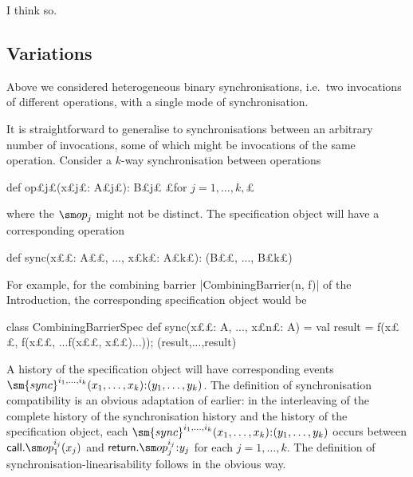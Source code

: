 
  I think so.


\subsection{Variations}
\label{ssec:spec-variations}

Above we considered heterogeneous binary synchronisations, i.e.~two
invocations of different operations, with a single mode of synchronisation.

It is straightforward to generalise to synchronisations between an arbitrary
number of invocations, some of which might be invocations of the same
operation.  Consider a $k$-way synchronisation between operations
\begin{scala}
  def op£\s j£(x£\s j£: A£\s j£): B£\s j£   £for $j = 1, \ldots, k,$£
\end{scala}
%
where the $\op_j$ might not be distinct.
The specification object will have a corresponding operation
%
\begin{scala} 
  def sync(x££: A££, ..., x£\s k£: A£\s k£): (B££, ..., B£\s k£)
\end{scala}
%
For example, for the combining barrier |CombiningBarrier(n, f)| of the
Introduction, the corresponding specification object would be
\begin{scala}
class CombiningBarrierSpec{
  def sync(x££: A, ..., x£\s n£: A) = {
    val result = f(x££, f(x££, ...f(x££, x££)...)); (result,...,result)
  }
}
\end{scala}

A history of the specification object will have corresponding events
$\sm{sync}^{i_1, \ldots, i_k}(x_1, \ldots, x_k)\:: (y_1, \ldots, y_k)$.
%
The definition of synchronisation compatibility is an obvious adaptation of
earlier: in the interleaving of the complete history of the synchronisation
history and the history of the specification object, each $\sm{sync}^{i_1,
  \ldots, i_k}(x_1, \ldots, x_k)\:: (y_1, \ldots, y_k)$ occurs between
$\call.\op_1^{i_j}(x_j)$ and $\return.\op_j^{i_j}\::y_j$ for each $j = 1, \ldots,
k$.  The definition of synchronisation-linearisability follows in the obvious
way. 

